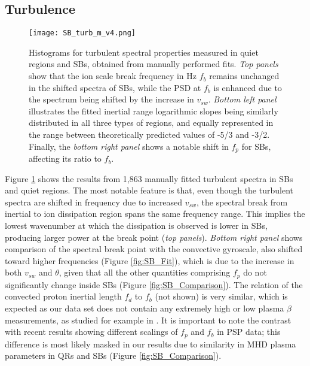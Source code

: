 \documentclass[]{aastex62}
\begin{document}

\subsection{Turbulence}
\label{sec:Results_Turbulence}

\begin{figure}
\centering
\texttt{[image: SB\_turb\_m\_v4.png]}
\caption{Histograms for turbulent spectral properties measured in quiet regions and SBs, obtained from manually performed fits. \emph{Top panels} show that the ion scale break frequency in Hz $f_b$ remains unchanged in the shifted spectra of SBs, while the PSD at $f_b$ is enhanced due to the spectrum being shifted by the increase in $v_{sw}$. \emph{Bottom left panel} illustrates the fitted inertial range logarithmic slopes being similarly distributed in all three types of regions, and equally represented in the range between theoretically predicted values of -5/3 and -3/2. Finally, the \emph{bottom right panel} shows a notable shift in $f_p$ for SBs, affecting its ratio to $f_b$.}
\label{fig:SB_turbulence}
\end{figure}


Figure \ref{fig:SB_turbulence} shows the results from 1,863 manually fitted turbulent spectra in SBs and quiet regions. The most notable feature is that, even though the turbulent spectra are shifted in frequency due to increased $v_{sw}$, the spectral break from inertial to ion dissipation region spans the same frequency range. This implies the lowest wavenumber at which the dissipation is observed is lower in SBs, producing larger power at the break point (\emph{top panels}). \emph{Bottom right panel} shows comparison of the spectral break point with the convective gyroscale, also shifted toward higher frequencies (Figure \ref{fig:SB_Fit}), which is due to the increase in both $v_{sw}$ and $\theta$, given that all the other quantities comprising $f_p$ do not significantly change inside SBs (Figure \ref{fig:SB_Comparison}). The relation of the convected proton inertial length $f_d$ to $f_b$ (not shown) is very similar, which is expected as our data set does not contain any extremely high or low plasma $\beta$ measurements, as studied for example in \cite{Chen_2014_GeoRL}. It is important to note the contrast with recent results \citep{Duan_2020_ApJS} showing different scalings of $f_p$ and $f_b$ in PSP data; this difference is most likely masked in our results due to similarity in MHD plasma parameters in QRs and SBs (Figure \ref{fig:SB_Comparison}).
\end{document}

